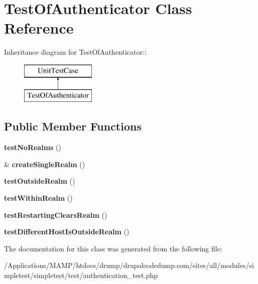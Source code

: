 \hypertarget{class_test_of_authenticator}{
\section{TestOfAuthenticator Class Reference}
\label{class_test_of_authenticator}
}
Inheritance diagram for TestOfAuthenticator::\begin{figure}[H]
\begin{center}
\leavevmode
\includegraphics[height=2cm]{class_test_of_authenticator}
\end{center}
\end{figure}
\subsection*{Public Member Functions}
\begin{DoxyCompactItemize}
\item 
\hypertarget{class_test_of_authenticator_a726c4b58ad3cf37cf93456f35c869a0e}{
{\bfseries testNoRealms} ()}
\label{class_test_of_authenticator_a726c4b58ad3cf37cf93456f35c869a0e}

\item 
\hypertarget{class_test_of_authenticator_a4dce4b031082bf9aa946dff2d2615a92}{
\& {\bfseries createSingleRealm} ()}
\label{class_test_of_authenticator_a4dce4b031082bf9aa946dff2d2615a92}

\item 
\hypertarget{class_test_of_authenticator_a0fbd19e312b4a7881264121d9ff134fe}{
{\bfseries testOutsideRealm} ()}
\label{class_test_of_authenticator_a0fbd19e312b4a7881264121d9ff134fe}

\item 
\hypertarget{class_test_of_authenticator_ab1f4a9cc6a46d96add62bd10fbef6780}{
{\bfseries testWithinRealm} ()}
\label{class_test_of_authenticator_ab1f4a9cc6a46d96add62bd10fbef6780}

\item 
\hypertarget{class_test_of_authenticator_a250086bd931f1b2119bacb872caf3ab1}{
{\bfseries testRestartingClearsRealm} ()}
\label{class_test_of_authenticator_a250086bd931f1b2119bacb872caf3ab1}

\item 
\hypertarget{class_test_of_authenticator_ae0bb67e47d7010ab6330f69b8c699ae8}{
{\bfseries testDifferentHostIsOutsideRealm} ()}
\label{class_test_of_authenticator_ae0bb67e47d7010ab6330f69b8c699ae8}

\end{DoxyCompactItemize}


The documentation for this class was generated from the following file:\begin{DoxyCompactItemize}
\item 
/Applications/MAMP/htdocs/drump/drupalcodedump.com/sites/all/modules/simpletest/simpletest/test/authentication\_\-test.php\end{DoxyCompactItemize}
